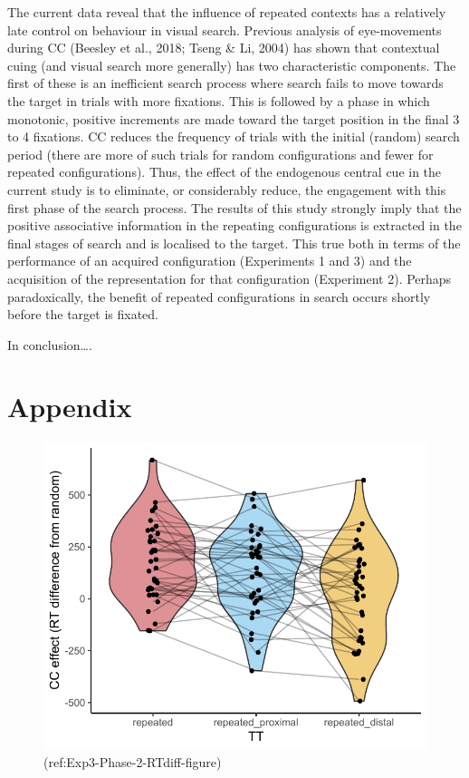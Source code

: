 \documentclass[
  man,floatsintext]{apa7}
\begin{document}
The current data reveal that the influence of repeated contexts has a relatively late control on behaviour in visual search. Previous analysis of eye-movements during CC (Beesley et al., 2018; Tseng \& Li, 2004) has shown that contextual cuing (and visual search more generally) has two characteristic components. The first of these is an inefficient search process where search fails to move towards the target in
trials with more fixations. This is followed by a phase in which monotonic, positive increments are made toward the target position in the final 3 to 4 fixations. CC reduces the frequency of trials with the initial (random) search period (there are more of such trials for random configurations and fewer for repeated configurations). Thus, the effect of the endogenous central cue in the current study is to eliminate, or considerably reduce, the engagement with this first phase of the search process. The results of this study strongly imply that the positive associative information in the repeating configurations is extracted in the final stages of search and is localised to the target. This true both in terms of the performance of an acquired configuration (Experiments 1 and 3) and the acquisition of the representation for that configuration (Experiment 2). Perhaps paradoxically, the benefit of repeated configurations in search occurs shortly before the target is fixated.

In conclusion\ldots.

\newpage

\hypertarget{appendix}{%
\section{Appendix}\label{appendix}}

\begin{figure}

{\centering \includegraphics{CCC_ms1_files/figure-latex/Exp3-Phase-2-RTdiff-figure-1} 

}

\caption{(ref:Exp3-Phase-2-RTdiff-figure)}\label{fig:Exp3-Phase-2-RTdiff-figure}
\end{figure}
\end{document}
